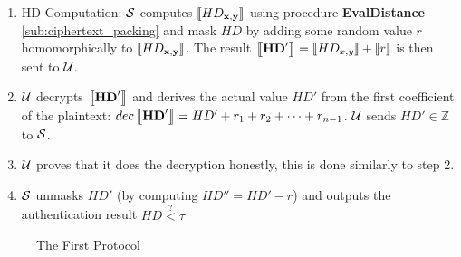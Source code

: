 \begin{description}
\begin{enumerate}
\item HD Computation: $\mathcal{S}$ computes $\left\llbracket HD_{\mathbf{x,y}}\right\rrbracket$ using
  procedure \textbf{EvalDistance} \ref{sub:ciphertext_packing} and mask $HD$ by adding some random
  value $r$ homomorphically to $\left\llbracket HD_{\mathbf{x,y}}\right\rrbracket$. The result
  $\left\llbracket\mathbf{HD}'\right\rrbracket = \left\llbracket HD_{x,y}\right\rrbracket + \left\llbracket r\right\rrbracket$ is then sent to $\mathcal{U}$.
\item \(\mathcal{U}\) decrypts $\left\llbracket\mathbf{HD}'\right\rrbracket$ and derives the actual value
  ${HD'}$ from the first coefficient of the plaintext:
  \( dec\left\llbracket\mathbf{HD}'\right\rrbracket = HD' + r_1 + r_2 + \dots + r_{n-1} \). \(\mathcal{U}\)
  sends \(HD' \in \mathbb{Z}\) to \(\mathcal{S}\).
\item \(\mathcal{U}\) proves that it does the decryption honestly, this is done
  similarly to step 2.
\item \(\mathcal{S}\) unmasks \(HD'\) (by computing $HD'' = HD' - r$) and outputs the authentication result
  \(HD \stackrel{?}{<} \tau\)
  \end{enumerate}

\end{description}

\begin{figure}[htbp!] 
  \centering {}
  \caption{The First Protocol}
  \label{fig:firstProtocol}
\end{figure}


